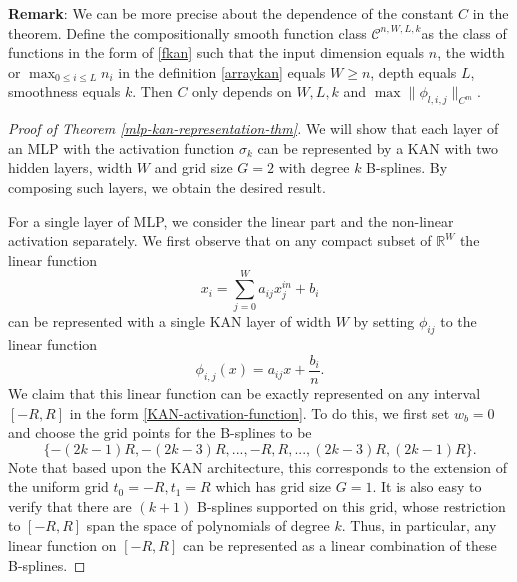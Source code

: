 \documentclass[12pt]{caltech_thesis}
\numberwithin{equation}{section}
\begin{document}
    \textbf{Remark}: We can be more precise about the dependence of the constant $C$ in the theorem. Define the compositionally smooth function class $\mathcal{C}^{n,W,L,k}$as the class of functions in the form of \eqref{fkan} such that the input dimension equals $n$, the width or $\max_{0\leq i\leq L}n_i$ in the definition \eqref{arraykan} equals $W\geq n$, depth equals $L$, smoothness equals $k$. Then $C$ only depends on $W,L,k$ and $\max \|{\phi_{l,i,j}}\|_{C^m}$.

\begin{proof}[Proof of Theorem \ref{mlp-kan-representation-thm}]
We will show that each layer of an MLP with the activation function $\sigma_k$ can be represented by a KAN with two hidden layers, width $W$ and grid size $G = 2$ with degree $k$ B-splines. By composing such layers, we obtain the desired result. 

For a single layer of MLP, we consider the linear part and the non-linear activation separately. We first observe that on any compact subset of $\mathbb{R}^W$ the linear function
\begin{equation}
    x_i = \sum_{j=0}^W a_{ij}x^{in}_j + b_i
\end{equation}
can be represented with a single KAN layer of width $W$ by setting $\phi_{ij}$ to the linear function
\begin{equation}
    \phi_{i,j}(x) = a_{ij}x + \frac{b_i}{n}.
\end{equation}
We claim that this linear function can be exactly represented on any interval $[-R,R]$ in the form \eqref{KAN-activation-function}. To do this, we first set $w_b = 0$ and choose the grid points for the B-splines to be $$\{-(2k-1)R, -(2k-3)R,...,-R,R,...,(2k-3)R, (2k-1)R\}.$$ 
Note that based upon the KAN architecture, this corresponds to the extension of the uniform grid $t_0 = -R, t_1 = R$ which has grid size $G = 1$. It is also easy to verify that there are $(k+1)$ B-splines supported on this grid, whose restriction to $[-R,R]$ span the space of polynomials of degree $k$. Thus, in particular, any linear function on $[-R,R]$ can be represented as a linear combination of these B-splines.


\end{proof}
\end{document}
